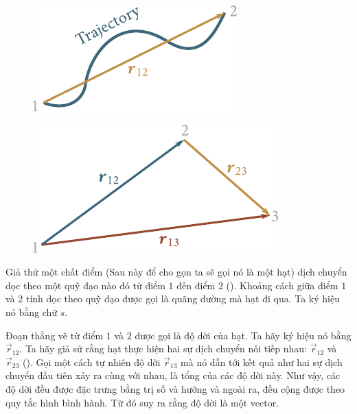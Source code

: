 \begin{figure}[!htb]
	\begin{minipage}[t]{0.5\linewidth}
		\begin{center}
			\includegraphics[scale=0.95]{figures/ch_01/fig_1_20.pdf}
			\caption[]{}
			\label{fig:1_20}
		\end{center}
	\end{minipage}
	\hfill{ }%
	\begin{minipage}[t]{0.5\linewidth}
		\begin{center}
			\includegraphics[scale=0.95]{figures/ch_01/fig_1_21.pdf}
			\caption[]{}
			\label{fig:1_21}
		\end{center}
	\end{minipage}
\end{figure}

Giả thử một chất điểm (Sau này để cho gọn ta sẽ gọi nó là một hạt) dịch chuyển dọc theo một quỹ đạo nào đó từ điểm $1$ đến điểm $2$ (). Khoảng cách giữa điểm $1$ và $2$ tính dọc theo quỹ đạo được gọi là quãng đường mà hạt đi qua. Ta ký hiệu nó bằng chữ $s$.

Đoạn thẳng vẽ từ điểm $1$ và $2$ được gọi là độ dời của hạt. Ta hãy ký hiệu nó bằng $\vec{r}_{12}$. Ta hãy giả sử rằng hạt thực hiện hai sự dịch chuyển nối tiếp nhau: $\vec{r}_{12}$ và $\vec{r}_{23}$ (). Gọi một cách tự nhiên độ dời $\vec{r}_{13}$ mà nó dẫn tới kết quả như hai sự dịch chuyển đầu tiên xảy ra cùng với nhau, là tổng của các độ dời này. Như vậy, các độ dời đều được đặc trưng bằng trị số và hướng và ngoài ra, đều cộng được theo quy tắc hình bình hành. Từ đó suy ra rằng độ dời là một vector.


